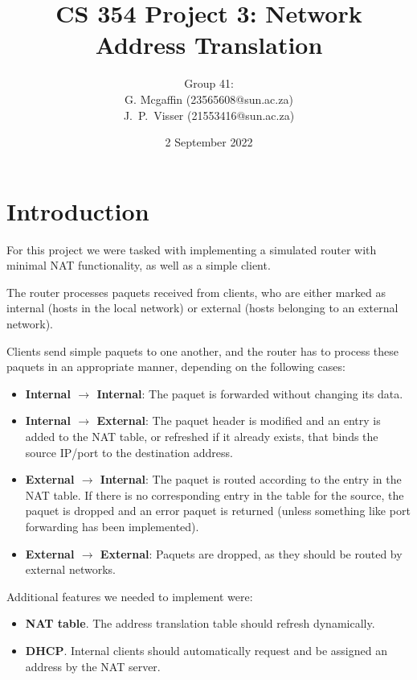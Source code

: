 \documentclass[10pt, a4paper]{article}
\title{CS 354 Project 3: Network Address Translation}
\author{Group 41: \vspace{0.5em} \\
        G. Mcgaffin (23565608@sun.ac.za) \vspace{0.3em} \\
        J.\ P.\ Visser (21553416@sun.ac.za)}
\date{\vspace{1em} 2 September 2022}
\begin{document}

\maketitle
\newpage



\tableofcontents
\newpage



\section{Introduction}
\label{sec:intro}


For this project we were tasked with implementing a simulated router with
minimal NAT functionality, as well as a simple client.

The router processes paquets received from clients, who are either marked as
internal (hosts in the local network) or external (hosts belonging to an
external network).

Clients send simple paquets to one another, and the router has to process these
paquets in an appropriate manner, depending on the following cases:
\begin{itemize}
  \item \textbf{Internal $\rightarrow$ Internal}: The paquet is forwarded
  without changing its data.
  \item \textbf{Internal $\rightarrow$ External}: The paquet header is modified
  and an entry is added to the NAT table, or refreshed if it already exists,
  that binds the source IP/port to the destination address.
  \item \textbf{External $\rightarrow$ Internal}: The paquet is routed according
  to the entry in the NAT table. If there is no corresponding entry in the table
  for the source, the paquet is dropped and an error paquet is returned (unless
  something like port forwarding has been implemented).
  \item \textbf{External $\rightarrow$ External}: Paquets are dropped, as they
  should be routed by external networks.
\end{itemize}

Additional features we needed to implement were:

\begin{itemize}
  \item \textbf{NAT table}. The address translation table should refresh
    dynamically.
  \item \textbf{DHCP}. Internal clients should automatically request and be
    assigned an address by the NAT server.
\end{itemize}
\end{document}
